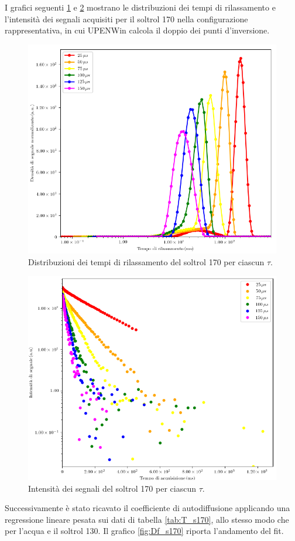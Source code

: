 I grafici seguenti \ref{fig:D_s170} e \ref{fig:S_s170} mostrano le distribuzioni dei tempi di rilassamento e l'intensità dei segnali acquisiti per il soltrol 170 nella configurazione rappresentativa, in cui UPENWin calcola il doppio dei punti d'inversione.

\begin{figure}[p]
\centering
\includegraphics[width=\columnwidth]{Figure/SOLTROL170.png}
\caption{Distribuzioni dei tempi di rilassamento del soltrol 170 per ciascun $\tau$.}
\label{fig:D_s170}
\end{figure}

\begin{figure}[p]
\centering
\includegraphics[width=\columnwidth]{Figure/SOLTROL170_SigTSig.png}
\caption{Intensità dei segnali del soltrol 170 per ciascun $\tau$.}
\label{fig:S_s170}
\end{figure}
\newpage Successivamente è stato ricavato il coefficiente di autodiffusione applicando una regressione lineare pesata sui dati di tabella \ref{tab:T_s170}, allo stesso modo che per l'acqua e il soltrol 130.
Il grafico \ref{fig:Df_s170} riporta l'andamento del fit.

